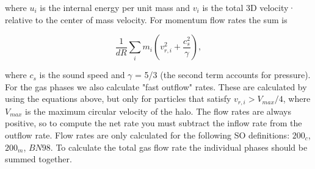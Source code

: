 where $u_i$ is the internal energy per unit mass and $v_i$ is the total 3D velocity·
relative to the center of mass velocity. For momentum flow rates the sum is

\begin{equation}
    \frac{1}{dR} \sum_{i} m_i \left(v_{r,i}^2 + \frac{c_s^2}{\gamma}\right),
\end{equation}

where $c_s$ is the sound speed and $\gamma$ = 5/3 (the second term accounts for pressure). For the gas phases we also calculate "fast outflow" rates. These are calculated by using the equations above, but only for particles that satisfy $v_{r,i} > V_{max} / 4$, where $V_{max}$ is the maximum circular velocity of the halo. The flow rates are always positive, so to compute the net rate you must subtract the inflow rate from the outflow rate. Flow rates are only calculated for the
following SO definitions: $200_{c}$, $200_{m}$, $BN98$. To calculate the total gas flow rate the individual phases should be summed together.
